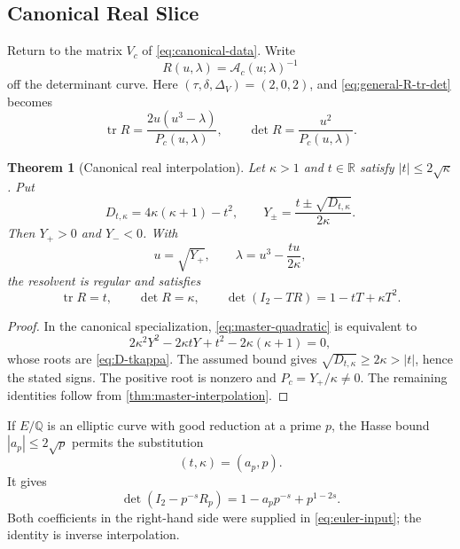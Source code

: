 \documentclass[11pt,reqno]{amsart}
\newtheorem{theorem}{Theorem}[section]
\theoremstyle{remark}
\newcommand{\R}{\mathbb R}
\newcommand{\Q}{\mathbb Q}
\newcommand{\tr}{\operatorname{tr}}
\newcommand{\cA}{\mathcal A}
\begin{document}
\subsection{Canonical Real Slice}

Return to the matrix $V_c$ of \eqref{eq:canonical-data}.  Write
\begin{equation}\label{eq:R-def}
 R(u,\lambda)=\cA_c(u;\lambda)^{-1}
\end{equation}
off the determinant curve.  Here $(\tau,\delta,\Delta_V)=(2,0,2)$, and
\eqref{eq:general-R-tr-det} becomes
\begin{equation}\label{eq:R-tr-det}
 \tr R=\frac{2u(u^3-\lambda)}{P_c(u,\lambda)},
 \qquad
 \det R=\frac{u^2}{P_c(u,\lambda)}.
\end{equation}

\begin{theorem}[Canonical real interpolation]\label{thm:real-interpolation}
Let $\kappa>1$ and $t\in\R$ satisfy $|t|\leq2\sqrt\kappa$.  Put
\begin{equation}\label{eq:D-tkappa}
 D_{t,\kappa}=4\kappa(\kappa+1)-t^2,
 \qquad
 Y_\pm=\frac{t\pm\sqrt{D_{t,\kappa}}}{2\kappa}.
\end{equation}
Then $Y_+>0$ and $Y_-<0$.  With
\begin{equation}\label{eq:interpolation-basepoint}
 u=\sqrt{Y_+},
 \qquad
 \lambda=u^3-\frac{tu}{2\kappa},
\end{equation}
the resolvent is regular and satisfies
\begin{equation}\label{eq:interpolation-result}
 \tr R=t,
 \qquad
 \det R=\kappa,
 \qquad
 \det(I_2-TR)=1-tT+\kappa T^2.
\end{equation}
\end{theorem}

\begin{proof}
In the canonical specialization, \eqref{eq:master-quadratic} is equivalent
to
\begin{equation}\label{eq:canonical-master-quadratic}
 2\kappa^2Y^2-2\kappa tY+t^2-2\kappa(\kappa+1)=0,
\end{equation}
whose roots are \eqref{eq:D-tkappa}.  The assumed bound gives
$\sqrt{D_{t,\kappa}}\geq2\kappa>|t|$, hence the stated signs.  The positive
root is nonzero and $P_c=Y_+/\kappa\ne0$.  The remaining identities follow from
\cref{thm:master-interpolation}.
\end{proof}

If $E/\Q$ is an elliptic curve with good reduction at a prime $p$, the Hasse
bound $|a_p|\leq2\sqrt p$ permits the substitution
\begin{equation}\label{eq:euler-input}
 (t,\kappa)=(a_p,p).
\end{equation}
It gives
\begin{equation}\label{eq:euler-interpolation}
 \det(I_2-p^{-s}R_p)
 =1-a_pp^{-s}+p^{1-2s}.
\end{equation}
Both coefficients in the right-hand side were supplied in
\eqref{eq:euler-input}; the identity is inverse interpolation.
\end{document}
